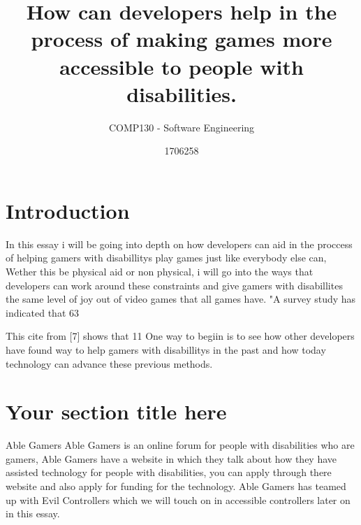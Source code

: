 \documentclass{scrartcl}
\title{How can developers help in the process of making games more accessible to people with disabilities.}
\subtitle{COMP130 - Software Engineering}
\author{1706258}
\begin{document}
\maketitle


\section{Introduction}
In this essay i will be going into depth on how developers can aid in the proccess of helping gamers with disabillitys play games just like everybody else can, Wether this be physical aid or non physical, i will go into the ways that developers can work around these constraints and give gamers with disabillites the same level of joy out of video games that all games have.
"A survey study has indicated that 63%

This cite from [7] shows that 11%
One way to begiin is to see how other developers have found way to help gamers with disabillitys in the past and how today technology can advance these previous methods.

\section{Your section title here}
Able Gamers
Able Gamers is an online forum for people with disabilities who are gamers, Able Gamers have a website in which they talk about how they have assisted technology for people with disabilities, you can apply through there website and also apply for funding for the technology.
Able Gamers has teamed up with Evil Controllers which we will touch on in accessible controllers later on in this essay.
\end{document}
